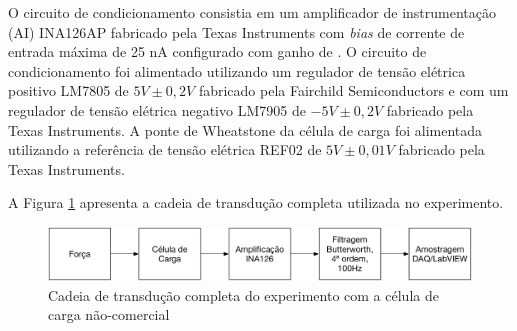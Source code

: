 \documentclass[a4paper]{instrumentacao}
\begin{document}
O circuito de condicionamento consistia em um amplificador de instrumentação (AI) INA126AP fabricado pela Texas Instruments com \textit{bias} de corrente de entrada máxima de 25 nA \cite{datasheet-ina126} configurado com ganho de . O circuito de condicionamento foi alimentado utilizando um regulador de tensão elétrica positivo LM7805 de $5V \pm 0,2V$ \cite{datasheet-lm7805} fabricado pela Fairchild Semiconductors e com um regulador de tensão elétrica negativo LM7905 de $-5V \pm 0,2V$ \cite{datasheet-lm7905} fabricado pela Texas Instruments. A ponte de Wheatstone da célula de carga foi alimentada utilizando a referência de tensão elétrica REF02 de $5V \pm 0,01V$ \cite{datasheet-ref02} fabricado pela Texas Instruments.

%
%
%

A Figura \ref{fig:celula-nao-comercial-cadeia-transducao} apresenta a cadeia de transdução completa utilizada no experimento.

\begin{figure}[H]
\center
\includegraphics[width=\textwidth]{NaoComercial-Cadeia-Transducao.pdf}
\caption{Cadeia de transdução completa do experimento com a célula de carga não-comercial}
\label{fig:celula-nao-comercial-cadeia-transducao}
\end{figure}
\end{document}

